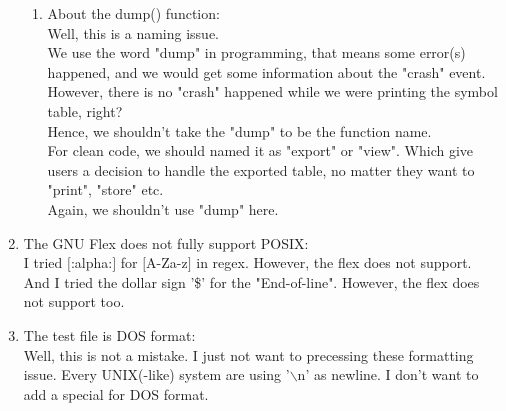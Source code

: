 \documentclass[12pt,a4paper]{article}
\begin{document}
\begin{CJK}{UTF8}{bsmi}
\begin{enumerate}
\begin{enumerate}
                  \item About the dump() function:\\
                        Well, this is a naming issue.\\
                        We use the word "dump" in programming, that means some error(s)
                        happened, and we would get some information about the "crash" event.
                        However, there is no "crash" happened while we were printing the
                        symbol table, right?\\
                        Hence, we shouldn't take the "dump" to be the function name.\\
                        For clean code, we should named it as "export" or "view". Which
                        give users a decision to handle the exported table, no matter they
                        want to "print", "store" etc.\\
                        Again, we shouldn't use "dump" here.
              \end{enumerate}

        \item The GNU Flex does not fully support POSIX:\\
              I tried $[$:alpha:$]$ for $[$A-Za-z$]$ in regex. However, the flex does
              not support.\\
              And I tried the dollar sign '\$' for the "End-of-line". However, the flex
              does not support too.

        \item The test file is DOS format:\\
              Well, this is not a mistake. I just not want to precessing these formatting issue.
              Every UNIX(-like) system are using '$\backslash$n' as newline. I don't want
              to add a special for DOS format.


\end{enumerate}
\end{CJK}
\end{document}
